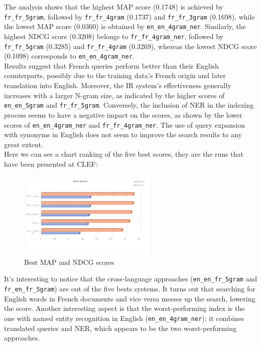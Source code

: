 The analysis shows that the highest MAP score (0.1748) is achieved by \texttt{fr\_fr\_5gram}, followed by
\texttt{fr\_fr\_4gram} (0.1737) and \texttt{fr\_fr\_3gram} (0.1698), while the lowest MAP score (0.0360) is obtained by
\texttt{en\_en\_4gram\_ner}.
Similarly, the highest NDCG score (0.3208) belongs to \texttt{fr\_fr\_4gram\_ner}, followed by \texttt{fr\_fr\_5gram}
(0.3285) and \texttt{fr\_fr\_4gram} (0.3269), whereas the lowest NDCG score (0.1098) corresponds to
\texttt{en\_en\_4gram\_ner}.\\

Results suggest that French queries perform better than their English counterparts, possibly due to the training data's
French origin and later translation into English.
Moreover, the IR system's effectiveness generally increases with a larger N-gram size, as indicated by the higher scores
of \texttt{en\_en\_5gram} and \texttt{fr\_fr\_5gram}.
Conversely, the inclusion of NER in the indexing process seems to have a negative impact on the scores, as shown by the
lower scores of \texttt{en\_en\_4gram\_ner} and \texttt{fr\_fr\_4gram\_ner}.
The use of query expansion with synonyms in English does not seem to improve the search results to any great extent.\\

Here we can see a chart ranking of the five best scores, they are the runs that have been presented at CLEF:
\begin{figure}[h!]
    \centering
    \includegraphics[width=0.6\textwidth]{figure/bestScores}
    \caption{Best MAP and NDCG scores}
    \label{fig:best_scores}
\end{figure}
It's interesting to notice that the cross-language approaches (\texttt{en\_en\_fr\_5gram} and
\texttt{fr\_en\_fr\_5gram}) are out of the five bests systems.
It turns out that searching for English words in French documents and vice versa messes up the search, lowering the
score.
Another interesting aspect is that the worst-performing index is the one with named entity recognition in English
(\texttt{en\_en\_4gram\_ner}): it combines translated queries and NER, which appears to be the two worst-performing
approaches.\\

